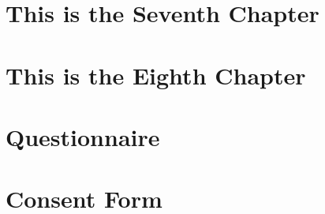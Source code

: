 \documentclass[12pt]{caltech_thesis}
\begin{document}
\chapter{This is the Seventh Chapter}
\chapter{This is the Eighth Chapter}




\appendix

\chapter{Questionnaire}
\chapter{Consent Form}

\printindex

\theendnotes

\pocketmaterial
{}
\end{document}
